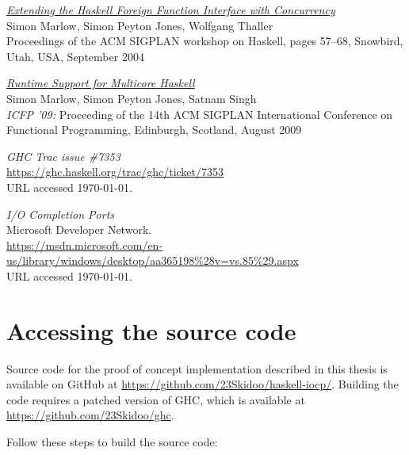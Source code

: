 \documentclass[a4paper,11pt,oneside]{report}
\begin{document}
\begin{thebibliography}{9}
  \href{http://community.haskell.org/~simonmar/bib/concffi04_abstract.html}{\emph{Extending the Haskell Foreign Function Interface with Concurrency}}\\
  \newblock Simon Marlow, Simon Peyton Jones, Wolfgang Thaller\\
  \newblock Proceedings of the ACM SIGPLAN workshop on Haskell, pages 57--68,
  Snowbird, Utah, USA, September 2004

  \href{http://community.haskell.org/~simonmar/bib/multicore-ghc-09_abstract.html}{\emph{Runtime Support for Multicore Haskell}}\\
  \newblock Simon Marlow, Simon Peyton Jones, Satnam Singh\\
  \newblock \emph{ICFP '09:} Proceeding of the 14th ACM SIGPLAN International
  Conference on Functional Programming, Edinburgh, Scotland, August 2009

 \emph{GHC Trac issue \#7353}\\
  \newblock \url{https://ghc.haskell.org/trac/ghc/ticket/7353}\\
  \newblock URL accessed \today.

 \emph{I/O Completion Ports}\\
  \newblock Microsoft Developer Network.\\
  \newblock
  \url{https://msdn.microsoft.com/en-us/library/windows/desktop/aa365198\%28v=vs.85\%29.aspx}\\
  \newblock URL accessed \today.

\end{thebibliography}

\appendix

\chapter{Accessing the source code}
\label{appendix:source-code}

Source code for the proof of concept implementation described in this thesis is
available on GitHub at \url{https://github.com/23Skidoo/haskell-iocp/}. Building
the code requires a patched version of GHC, which is available at
\url{https://github.com/23Skidoo/ghc}.

Follow these steps to build the source code:
\end{document}

